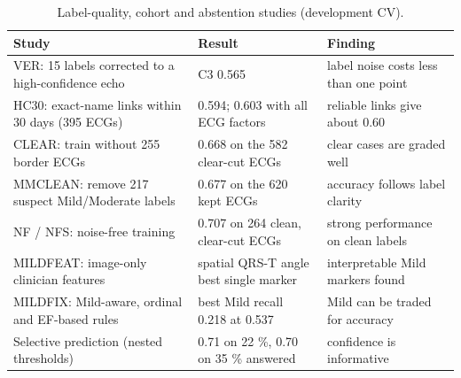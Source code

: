 \begin{table}[htbp]
\caption{Label-quality, cohort and abstention studies (development CV).}\label{tab:4.7}
\small
\begin{tabular}{>{\raggedright\arraybackslash\hspace{0pt}}p{}>{\raggedright\arraybackslash\hspace{0pt}}p{}>{\raggedright\arraybackslash\hspace{0pt}}p{}}
\toprule
\textbf{Study} & \textbf{Result} & \textbf{Finding} \\
\midrule
VER: 15 labels corrected to a high-confidence echo & C3 0.565 & label noise costs less than one point \\
HC30: exact-name links within 30 days (395 ECGs) & 0.594; 0.603 with all ECG factors & reliable links give about 0.60 \\
CLEAR: train without 255 border ECGs & 0.668 on the 582 clear-cut ECGs & clear cases are graded well \\
MMCLEAN: remove 217 suspect Mild/Moderate labels & 0.677 on the 620 kept ECGs & accuracy follows label clarity \\
NF / NFS: noise-free training & 0.707 on 264 clean, clear-cut ECGs & strong performance on clean labels \\
MILDFEAT: image-only clinician features & spatial QRS-T angle best single marker & interpretable Mild markers found \\
MILDFIX: Mild-aware, ordinal and EF-based rules & best Mild recall 0.218 at 0.537 & Mild can be traded for accuracy \\
Selective prediction (nested thresholds) & 0.71 on 22 \%, 0.70 on 35 \% answered & confidence is informative \\
\bottomrule
\end{tabular}
\end{table}

